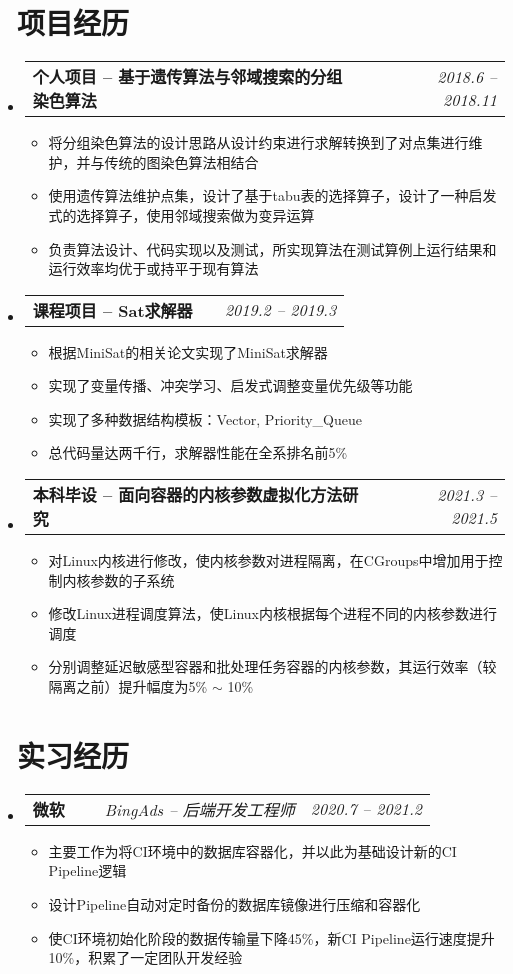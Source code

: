 \documentclass[utf8,letterpaper,11pt]{ctexart}
\makeatletter
\newcommand{\resumeOneItem}[1]{
  \item\small{
    {#1 \vspace{-2pt}}
  }
}
\newcommand{\resumeSubheading}[4]{
  \vspace{-1pt}\item
    \begin{tabular*}{0.97\textwidth}[t]{l@{\extracolsep{\fill}}r}
      \textbf{#1} & \textit{#2} \\
      \textit{\small#3} & \textit{\small #4} \\
    \end{tabular*}\vspace{-5pt}
}
\newcommand{\resumeTwoItemHeading}[2]{
  \vspace{-1pt}\item
    \begin{tabular*}{0.97\textwidth}{l@{\extracolsep{\fill}}r}
      \textbf{#1} & \textit{\small #2} \\
    \end{tabular*}\vspace{-5pt}
}
\newcommand{\resumeThreeItemHeading}[3]{
  \vspace{-1pt}\item
    \begin{tabular*}{0.97\textwidth}{ll@{\extracolsep{\fill}}r}
      \textbf{#1}\ \ \ &  \textit{\small#2} & \textit{\small #3} \\
    \end{tabular*}\vspace{-5pt}
}
\newcommand{\resumeSubHeadingListStart}{\begin{itemize}[leftmargin=*]}
\newcommand{\resumeSubHeadingListEnd}{\end{itemize}}
\newcommand{\resumeItemListStart}{\begin{itemize}}
\newcommand{\resumeItemListEnd}{\end{itemize}\vspace{-5pt}}
\makeatother
\begin{document}
\section{\faLayerGroup \ 项目经历}
\resumeSubHeadingListStart
  \resumeTwoItemHeading{个人项目 -- 基于遗传算法与邻域搜索的分组染色算法}{\href{https://github.com/copyrightpoiiiii/Hybrid-Evolutionary-Algorithms-for-the-Partition-Coloring-Problem}{\faGithub*}\ \ 2018.6 -- 2018.11}
    \resumeItemListStart
          \resumeOneItem{将分组染色算法的设计思路从设计约束进行求解转换到了对点集进行维护，并与传统的图染色算法相结合}
          \resumeOneItem{使用遗传算法维护点集，设计了基于tabu表的选择算子，设计了一种启发式的选择算子，使用邻域搜索做为变异运算}
          \resumeOneItem{负责算法设计、代码实现以及测试，所实现算法在测试算例上运行结果和运行效率均优于或持平于现有算法}
    \resumeItemListEnd
  \resumeTwoItemHeading{课程项目 -- Sat求解器}{\href{https://github.com/copyrightpoiiiii/Sat-and-Sudoku-Solver}{\faGithub*}\ \ 2019.2 -- 2019.3}
    \resumeItemListStart
          \resumeOneItem{根据MiniSat的相关论文实现了MiniSat求解器}
          \resumeOneItem{实现了变量传播、冲突学习、启发式调整变量优先级等功能}
          \resumeOneItem{实现了多种数据结构模板：Vector, Priority\_Queue}
          \resumeOneItem{总代码量达两千行，求解器性能在全系排名前5\%}
    \resumeItemListEnd
     \resumeTwoItemHeading{本科毕设 -- 面向容器的内核参数虚拟化方法研究}{2021.3 -- 2021.5}
     \resumeItemListStart
           \resumeOneItem{对Linux内核进行修改，使内核参数对进程隔离，在CGroups中增加用于控制内核参数的子系统}
           \resumeOneItem{修改Linux进程调度算法，使Linux内核根据每个进程不同的内核参数进行调度}
           \resumeOneItem{分别调整延迟敏感型容器和批处理任务容器的内核参数，其运行效率（较隔离之前）提升幅度为5\% $\sim$ 10\%}
     \resumeItemListEnd
\resumeSubHeadingListEnd
\vspace{1pt}
\section{\faBriefcase \ 实习经历}
  \resumeSubHeadingListStart
    \resumeThreeItemHeading{微软}{BingAds -- 后端开发工程师}{2020.7 -- 2021.2}
        \resumeItemListStart
        \resumeOneItem{主要工作为将CI环境中的数据库容器化，并以此为基础设计新的CI Pipeline逻辑}
        \resumeOneItem{设计Pipeline自动对定时备份的数据库镜像进行压缩和容器化}
        \resumeOneItem{使CI环境初始化阶段的数据传输量下降45\%，新CI Pipeline运行速度提升10\%，积累了一定团队开发经验}
        \resumeItemListEnd
  \resumeSubHeadingListEnd
\vspace{1pt}
\end{document}
